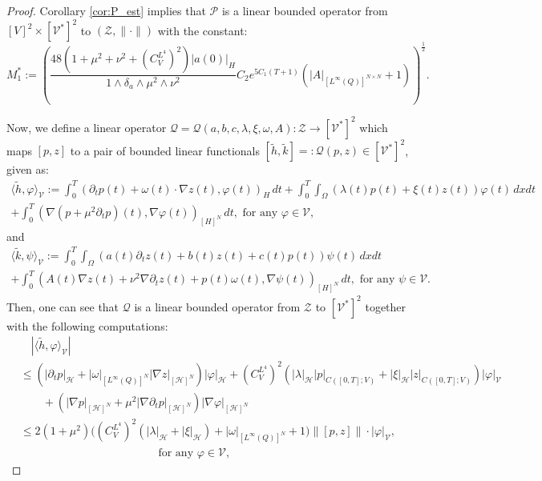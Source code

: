 \documentclass{sinst}
\numberwithin{equation}{section}
\theoremstyle{plain}
\theoremstyle{definition}
\def\sH{\mathscr{H}}
\def\sP{\mathscr{P}}
\def\sQ{\mathscr{Q}}
\def\sV{\mathscr{V}}
\def\sZ{\mathscr{Z}}
\begin{document}
\begin{proof}
  Corollary \ref{cor:P_est} implies that $\sP$ is a linear bounded operator from $[V]^2 \times [\sV^*]^2$ to $(\sZ, \| \cdot \|)$ with the constant:
  \begin{equation}
    M_1^* := \left(\frac{48(1 + \mu^2 + \nu^2 + (C_V^{L^4})^2)|a(0)|_H}{1 \wedge \delta_a \wedge \mu^2 \wedge \nu^2} C_2 e^{5 C_1 (T+1)}(|A|_{[L^\infty(Q)]^{N \times N}} + 1)\right)^\frac{1}{2}.
  \end{equation}

  Now, we define a linear operator $\sQ = \sQ(a,b,c,\lambda,\xi,\omega,A): \sZ \longrightarrow [\sV^*]^2$ which maps $[p,z]$ to a pair of bounded linear functionals $[\tilde h, \tilde k] =: \sQ(p,z) \in [\sV^*]^2$, given as:
  \begin{gather}
    \langle \tilde h, \varphi \rangle_\sV := \int_0^T (\partial_t p(t) + \omega(t) \cdot \nabla z(t), \varphi(t))_H \,dt + \int_0^T \int_\Omega (\lambda(t) p(t) + \xi(t)z(t)) \varphi(t) \,dxdt 
    \\
    + \int_0^T (\nabla (p + \mu^2 \partial_t p)(t), \nabla \varphi(t))_{[H]^N} \,dt, \mbox{ for any } \varphi \in \sV,
  \end{gather}
  and
  \begin{gather}
    \langle \tilde k,\psi \rangle_\sV := \int_0^T \int_\Omega (a(t) \partial_t z(t) + b(t) z(t) + c(t) p(t)) \psi(t) \,dxdt 
    \\
    + \int_0^T (A(t) \nabla z(t) + \nu^2\nabla \partial_t z(t) + p(t)\omega(t), \nabla \psi(t))_{[H]^N} \,dt, \mbox{ for any } \psi \in \sV.
  \end{gather}
  Then, one can see that $\sQ$ is a linear bounded operator from $\sZ$ to $[\sV^*]^2$ together with the following computations:
  \begin{align}
    &\quad |\langle \tilde h, \varphi \rangle_\sV| 
    \\
    &\leq (|\partial_t p|_\sH + |\omega|_{[L^\infty(Q)]^N} |\nabla z|_{[\sH]^N})|\varphi|_\sH + (C_V^{L^4})^2(|\lambda|_\sH |p|_{C([0,T];V)} + |\xi|_\sH |z|_{C([0,T];V)}) |\varphi|_\sV
    \\
    &\qquad + (|\nabla p|_{[\sH]^N} + \mu^2 |\nabla \partial_t p|_{[\sH]^N}) |\nabla \varphi|_{[\sH]^N} 
    \\
    &\leq 2 (1 + \mu^2)\bigl( (C_V^{L^4})^2 (|\lambda|_\sH + |\xi|_\sH) + |\omega|_{[L^\infty(Q)]^N} + 1\bigr)\| [p,z] \| \cdot |\varphi|_\sV,
    \\
    &\qquad\qquad\qquad\qquad\qquad\qquad \mbox{ for any } \varphi \in \sV,

\end{align}
\end{proof}
\end{document}
